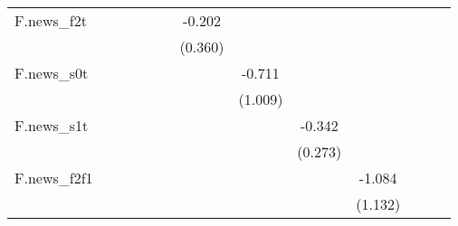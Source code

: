{\begin{tabular}{l*{12}{c}}
\addlinespace
F.news\_f2t  &                     &                     &                     &                     &                     &      -0.202         &                     &                     &                     &                     &                     &                     \\
            &                     &                     &                     &                     &                     &     (0.360)         &                     &                     &                     &                     &                     &                     \\
\addlinespace
F.news\_s0t  &                     &                     &                     &                     &                     &                     &      -0.711         &                     &                     &                     &                     &                     \\
            &                     &                     &                     &                     &                     &                     &     (1.009)         &                     &                     &                     &                     &                     \\
\addlinespace
F.news\_s1t  &                     &                     &                     &                     &                     &                     &                     &      -0.342         &                     &                     &                     &                     \\
            &                     &                     &                     &                     &                     &                     &                     &     (0.273)         &                     &                     &                     &                     \\
\addlinespace
F.news\_f2f1 &                     &                     &                     &                     &                     &                     &                     &                     &      -1.084         &                     &                     &                     \\
            &                     &                     &                     &                     &                     &                     &                     &                     &     (1.132)         &                     &                     &                     \\

\end{tabular}}
